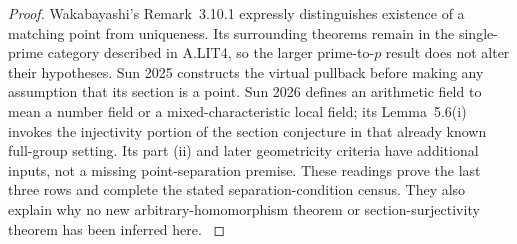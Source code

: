 \begin{proof}
Wakabayashi's Remark~3.10.1 expressly distinguishes existence
of a matching point from uniqueness. Its surrounding theorems
remain in the single-prime category described in A.LIT4, so
the larger prime-to-$p$ result does not alter their hypotheses.
Sun 2025 constructs the virtual pullback before making any
assumption that its section is a point. Sun 2026 defines an
arithmetic field to mean a number field or a mixed-characteristic
local field; its Lemma~5.6(i) invokes the injectivity portion
of the section conjecture in that already known full-group
setting. Its part (ii) and later geometricity criteria have
additional inputs, not a missing point-separation premise.
These readings prove the last three rows and complete the
stated separation-condition census. They also explain why no
new arbitrary-homomorphism theorem or section-surjectivity
theorem has been inferred here.
\citep[Definition~1.18, \S2, Theorem~3.10,
Corollary~3.11]{LA_Mochizuki2007}
\citep[Theorems~3.9,4.4, Remark~3.10.1]{LA_Wakabayashi2016}
\citep[Definition~3.1, Proposition~3.7, Corollary~3.8,
Theorems~A--C]{LA_Sun2025}
\citep[\S2, Lemma~5.6, Theorem~5.7, Corollary~5.8]{LA_Sun2026}
\end{proof}
